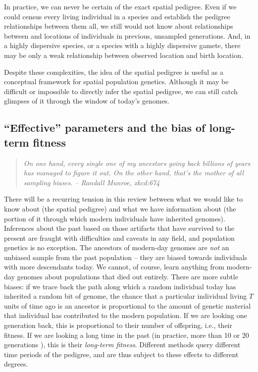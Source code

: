 \documentclass{ar-1col}
\newcommand{\g}[1]{{\color{blue}{#1}}}
\newcommand{\plr}[1]{{\color{green}{#1}}}
\begin{document}
In practice, we can never be certain of the exact spatial pedigree.
Even if we could census every living individual in a species
and establish the pedigree relationships between them all,
we still would not know about relationships between
and locations of individuals in previous, unsampled generations.
And, in a highly dispersive species,
or a species with a highly dispersive gamete,
there may be only a weak relationship between observed location and birth location.

Despite these complexities,
the idea of the spatial pedigree is useful
as a conceptual framework for spatial population genetics.
Although it may be difficult or impossible
to directly infer the spatial pedigree,
we can still catch glimpses of it through the window of today's genomes.

\subsection{``Effective'' parameters and the bias of long-term fitness}

\g{I like this section, and it makes a good point, 
but we don't really tie much into it elsewhere, 
and, as is, it feels like one preamble too many.
I think I mostly want to keep it because of how well the quote fits it.
Could we work in the message elsewhere in shorter format?
}
\plr{How's this?}

\begin{quote}
    \textit{
    On one hand, every single one of my ancestors going back billions of years
    has managed to figure it out.
    On the other hand, that's the mother of all sampling biases.}
    \hfill \textit{-- Randall Munroe, xkcd:674}
\end{quote}

There will be a recurring tension in this review
between what we would like to know about (the spatial pedigree)
and what we have information about 
(the portion of it through which modern individuals have inherited genomes).
Inferences about the past
based on those artifacts that have survived to the present
are fraught with difficulties and caveats in any field, 
and population genetics is no exception.
The ancestors of modern-day genomes are \textit{not} an unbiased sample
from the past population -- 
they are biased towards individuals with more descendants today.
We cannot, of course, learn anything from modern-day genomes
about populations that died out entirely.
There are more subtle biases:
if we trace back the path along which a random individual today 
has inherited a random bit of genome,
the chance that a particular individual living $T$ units of time ago is an ancestor
is proportional to the amount of genetic material that individual has contributed to the modern population.
If we are looking one generation back, 
this is proportional to their number of offspring, i.e., their fitness.
If we are looking a long time in the past
(in practice, more than 10 or 20 generations \citep{BartonEtheridge2011fitness}),
this is their \textit{long-term fitness}.
Different methods query different time periods of the pedigree,
and are thus subject to these effects to different degrees.
\end{document}

